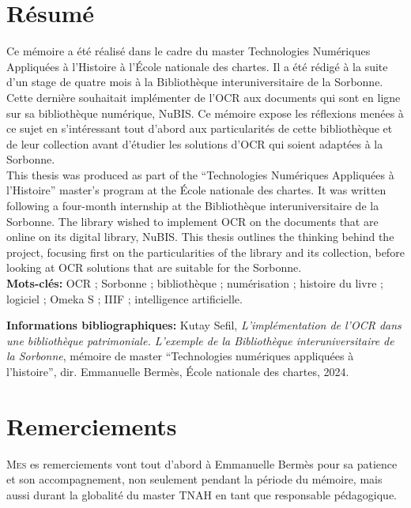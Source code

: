 \documentclass[a4paper,12pt,twoside]{book}
\begin{document}
	\chapter{Résumé}
\medskip
	Ce mémoire a été réalisé dans le cadre du master Technologies Numériques Appliquées à l'Histoire à l’École nationale des chartes. Il a été rédigé à la suite d’un stage de quatre mois à la Bibliothèque interuniversitaire de la Sorbonne. Cette dernière souhaitait implémenter de l’OCR aux documents qui sont en ligne sur sa bibliothèque numérique, NuBIS. Ce mémoire expose les réflexions menées à ce sujet en s’intéressant tout d’abord aux particularités de cette bibliothèque et de leur collection avant d’étudier les solutions d’OCR qui soient adaptées à la Sorbonne.\\
	
	This thesis was produced as part of the “Technologies Numériques Appliquées à l'Histoire” master's program at the École nationale des chartes. It was written following a four-month internship at the Bibliothèque interuniversitaire de la Sorbonne. The library wished to implement OCR on the documents that are online on its digital library, NuBIS. This thesis outlines the thinking behind the project, focusing first on the particularities of the library and its collection, before looking at OCR solutions that are suitable for the Sorbonne.\\ 
	
	\textbf{Mots-clés:} OCR ; Sorbonne ; bibliothèque ; numérisation ; histoire du livre ; logiciel ; Omeka S ; IIIF ; intelligence artificielle.
	
	\textbf{Informations bibliographiques:} Kutay Sefil, \textit{L’implémentation de l’OCR dans une bibliothèque patrimoniale. L’exemple de la Bibliothèque interuniversitaire de la Sorbonne}, mémoire de master \enquote{Technologies numériques appliquées à l'histoire}, dir. Emmanuelle Bermès, École nationale des chartes, 2024.
	
		\newpage{\pagestyle{empty}\cleardoublepage}
	
	\chapter{Remerciements}
	
\lettrine{M}{es} es remerciements vont tout d’abord à Emmanuelle Bermès pour sa patience et son accompagnement, non seulement pendant la période du mémoire, mais aussi durant la globalité du master TNAH en tant que responsable pédagogique.\\
\end{document}
